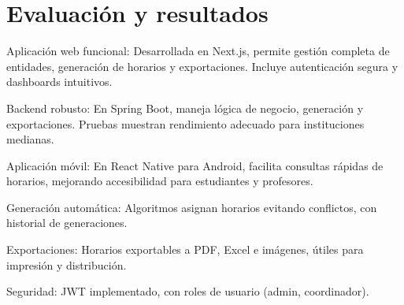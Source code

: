 \section{Evaluación y resultados}
Aplicación web funcional: Desarrollada en Next.js, permite gestión completa de entidades, generación de horarios y exportaciones. Incluye autenticación segura y dashboards intuitivos.

Backend robusto: En Spring Boot, maneja lógica de negocio, generación y exportaciones. Pruebas muestran rendimiento adecuado para instituciones medianas.

Aplicación móvil: En React Native para Android, facilita consultas rápidas de horarios, mejorando accesibilidad para estudiantes y profesores.

Generación automática: Algoritmos asignan horarios evitando conflictos, con historial de generaciones.

Exportaciones: Horarios exportables a PDF, Excel e imágenes, útiles para impresión y distribución.

Seguridad: JWT implementado, con roles de usuario (admin, coordinador).